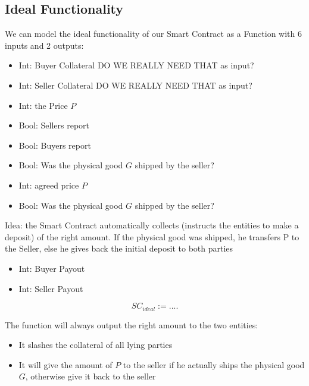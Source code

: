 \documentclass{cacthesis}
\begin{document}
\subsection{Ideal Functionality}
We can model the ideal functionality of our Smart Contract as a Function with 6 inputs and 2 outputs:

\begin{itemize}
\item{Int: Buyer Collateral DO WE REALLY NEED THAT as input?}
\item{Int: Seller Collateral DO WE REALLY NEED THAT as input?}
\item{Int: the Price $P$}
\item{Bool: Sellers report}
\item{Bool: Buyers report}
\item{Bool: Was the physical good $G$ shipped by the seller?}
\end{itemize}

\begin{itemize}
\item{Int: agreed price $P$}
\item{Bool: Was the physical good $G$ shipped by the seller?}
\end{itemize}
Idea: the Smart Contract automatically collects  (instructs the entities to make a deposit) of the right amount. If the physical good was shipped, he transfers P to the Seller, else he gives back the initial deposit to both parties

\begin{itemize}
\item{Int: Buyer Payout}
\item{Int: Seller Payout}
\end{itemize}

\begin{equation}
	SC_{ideal}:= ....	
\end{equation}

The function will always output the right amount to the two entities:
\begin{itemize}
    \item It slashes the collateral of all lying parties
    \item It will give the amount of $P$ to the seller if he actually ships the physical good $G$, otherwise give it back to the seller
\end{itemize}
\end{document}
